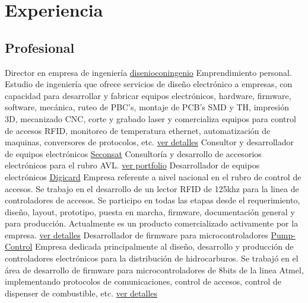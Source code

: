 \documentclass[11pt,a4paper,sans]{moderncv}  %
\begin{document}
\section{Experiencia}
   \subsection{Profesional}
       { Director en empresa de ingeniería}                 { \href { www.disenioconingenio.com.ar} { disenioconingenio}} { } { } { Emprendimiento personal. Estudio de ingeniería que ofrece servicios de diseño electrónico a empresas, con capacidad para desarrollar y fabricar equipos electrónicos, hardware, firmware, software, mecánica, ruteo de PBC's, montaje de PCB's SMD y TH, impresión 3D, mecanizado CNC, corte y grabado laser y comercializa equipos para control de accesos RFID, monitoreo de temperatura ethernet, automatización de maquinas, conversores de protocolos, etc. \href { http://disenioconingenio.com.ar/producto.php?products_id=398} { ver detalles}}
           { Consultor y desarrollador de equipos electrónicos} { \href { www.seconsat.com}             { Seconsat}}          { } { } { Consultoría y desarrollo de accesorios electrónicos para el rubro AVL. \hyperlink{subsec:seconsat}{ver portfolio}}
           { Desarrollador de equipos electrónicos}             { \href { www.digicard.com.ar}          { Digicard}}          { } { } { Empresa referente a nivel nacional en el rubro de control de accesos. Se trabajo en el desarrollo de un lector RFID de 125khz para la linea de controladores de accesos. Se participo en todas las etapas desde el requerimiento, diseño, layout, prototipo, puesta en marcha, firmware, documentación general y para producción. Actualmente es un producto comercializado activamente por la empresa. \href                                                          { http://disenioconingenio.com.ar/producto.php?products_id=393} { ver detalles}}
           { Desarrollador de firmware para microcontroladores} { \href { www.pump-control.com.ar}      { Pump-Control}}      { } { } { Empresa dedicada principalmente al diseño, desarrollo y producción de controladores electrónicos para la distribución de hidrocarburos. Se trabajó en el área de desarrollo de firmware para microcontroladores de 8bits de la linea Atmel, implementando protocolos de comunicaciones, control de accesos, control de dispenser de combustible, etc. \href                                                                                                            { http://disenioconingenio.com.ar/producto.php?products_id=391} { ver detalles}}
\end{document}
